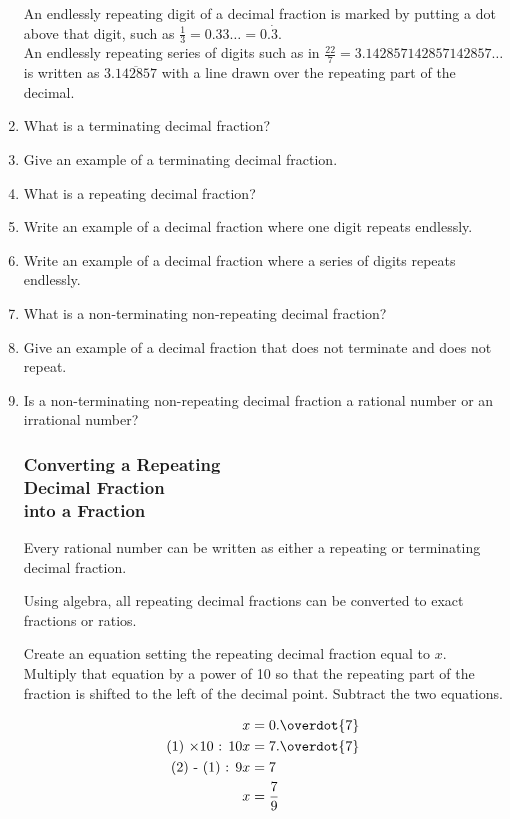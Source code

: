 \documentclass{article}
\begin{document}
\begin{enumerate}
An endlessly repeating digit of a decimal fraction is marked by putting a dot above that digit, such as $\frac{1}{3}=0.33\ldots=0.\dot{3}.$\\

An endlessly repeating series of digits such as in $\frac{22}{7}=3.142857142857142857\dots$ is written as $3.\overline{142857}$ with a line drawn over the repeating part of the decimal.\\

\item What is a terminating decimal fraction?
\item Give an example of a terminating decimal fraction.

\item What is a repeating decimal fraction?
\item Write an example of a decimal fraction where one digit repeats endlessly.
\item Write an example of a decimal fraction where a series of digits repeats endlessly.

\item What is a non-terminating non-repeating decimal fraction?
\item Give an example of a decimal fraction that does not terminate and does not repeat.
\item Is a non-terminating non-repeating decimal fraction a rational number or an irrational number?

\subsubsection*{Converting a Repeating\\Decimal Fraction\\into a Fraction}

Every rational number can be written as either a repeating or terminating decimal fraction.

Using algebra, all repeating decimal fractions can be converted to exact fractions or ratios.

Create an equation setting the repeating decimal fraction  equal to $x$. Multiply that equation by a power of 10 so that the repeating part of the fraction is shifted to the left of the decimal point. Subtract the two equations.

\begin{align}
                            x&=0.\overdot{7}\\
\text{(1) $\times 10$ : } 10x&=7.\overdot{7}\\
      \text{(2) - (1) : }  9x&=7\\
                            x&=\frac{7}{9}
\end{align}


\end{enumerate}
\end{document}
